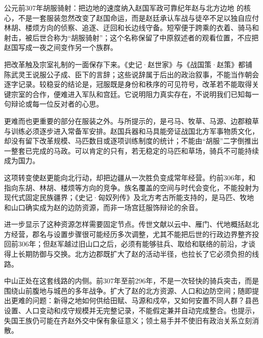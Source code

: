 \begin{event}{公元前307年}{胡服骑射：把边地的速度纳入赵国军政}{可靠纪年}{赵与北方边地}
的核心，不是一套服装忽然改变了赵国命运，而是赵廷承认车战与徒卒不足以独自应付林胡、楼烦方向的侦察、追逐、迂回和长边线守备。短窄便于跨乘的衣着、骑马和射击，被后世合称为“胡服骑射”；这个名称保留了中原叙述者的观看位置，不应把赵国写成一夜之间变作另一个族群。

把改革触及宗室礼制的一面保存下来。《史记·赵世家》与《战国策·赵策》都铺陈武灵王说服公子成、臣下的言辞；这些说辞属于后出的政治叙事，不能当作朝会逐字记录。较稳妥的结论是，冠服既是身份和秩序的可见符号，改革若不能取得关键宗室的合作，便难进入军队和宫廷。它说明阻力真实存在，不说明我们已知每一句辩论或每一位反对者的心思。

更难而也更重要的部分在服装之外。与所提示的，是弓马、牧草、马源、边郡粮草与训练必须逐步进入常备军安排。赵国兵器和马具能旁证战国北方军事物质文化，却没有留下改革规模、马匹数目或逐项训练制度的统计；不能由“胡服”二字倒推出一整套已完成的马政。可以肯定的只有，若无稳定的马匹和草场，骑兵不可能持续成为国力。
\end{event}

这项转变使赵更能向北行动，却把边疆从一次胜负变成常年经营。约前306年，和指向东胡、林胡、楼烦等方向的竞争。族名覆盖的空间与时代会变化，不能投射为现代式固定民族疆界；《史记·匈奴列传》及北方考古所能支持的，是马匹、牧地和山口确实成为赵的边防资源，而非一场宫廷服饰辩论的余音。

进一步显示了这种资源怎样需要固定节点。传世文献以云中、雁门、代地概括赵北方经营，郡名与设置步骤很可能经历多次调整，尤其不能把后世的行政边界整齐投回前306年；但赵军越过旧山口之后，必须有能够驻兵、取给和联络的前沿，才谈得上长期防御与交换。北方边郡既扩大了赵的活动半径，也拉长了它必须负担的线路。

中山正处在这套线路的内侧。前307年至前296年，不是一次轻快的骑兵突击，而是围绕山前腹地与城邑的多年战争。扩大了赵的北方资源、人口和边防空间；随即提出更难的问题：新得之地如何供给田赋、马源和戍卒，又如何安置不同人群？县邑设置、人口变动和戍守规模并无完整记录，不能假定兼并自动完成整合。也提示，失国王族仍可能在齐赵外交中保有象征意义；领土易手并不使旧有政治关系立刻消散。

